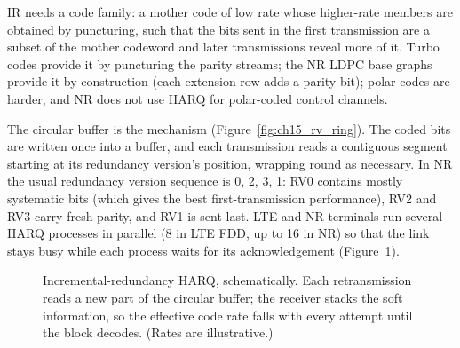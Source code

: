 IR needs a  code family: a mother code of low rate whose higher-rate members
are obtained by puncturing, such that the bits sent in the first transmission are a subset of the
mother codeword and later transmissions reveal more of it. Turbo codes provide it by puncturing the
parity streams; the NR LDPC base graphs provide it by construction (each extension row adds a parity
bit); polar codes are harder, and NR does not use HARQ for polar-coded control channels.

The circular buffer is the mechanism (Figure~\ref{fig:ch15_rv_ring}). The coded bits are written once
into a buffer, and each transmission reads a contiguous segment starting at its redundancy version's
position, wrapping round as necessary. In NR the usual redundancy version sequence is 0, 2, 3, 1: RV0
contains mostly systematic bits (which gives the best first-transmission performance), RV2 and RV3
carry fresh parity, and RV1 is sent last. LTE and NR terminals run several HARQ processes in parallel
(8 in LTE FDD, up to 16 in NR) so that the link stays busy while each process waits for its
acknowledgement (Figure~\ref{fig:ch15_harq_timeline}).

\begin{figure}[htbp]\centering
{}
\caption{Incremental-redundancy HARQ, schematically. Each retransmission reads a new part of the
circular buffer; the receiver stacks the soft information, so the effective code rate falls with
every attempt until the block decodes. (Rates are illustrative.)}
\label{fig:ch15_harq_timeline}
\end{figure}

